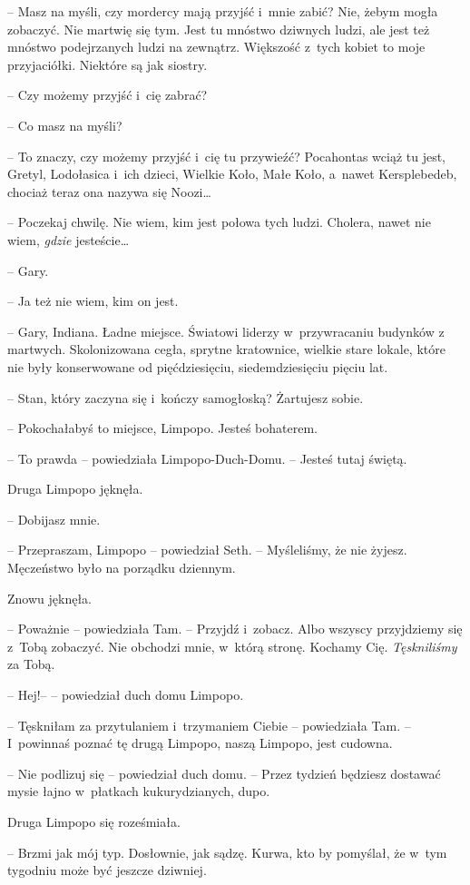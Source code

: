 \documentclass[oneside,polish,11pt,sfheadings]{mwbk}
\begin{document}
-- Masz na myśli, czy mordercy mają przyjść i~mnie zabić? Nie, żebym
mogła zobaczyć. Nie martwię się tym. Jest tu mnóstwo dziwnych ludzi, ale
jest też mnóstwo podejrzanych ludzi na zewnątrz. Większość z~tych kobiet
to moje przyjaciółki. Niektóre są jak siostry.

-- Czy możemy przyjść i~cię zabrać?

-- Co masz na myśli?

-- To znaczy, czy możemy przyjść i~cię tu przywieźć? Pocahontas wciąż tu
jest, Gretyl, Lodołasica i~ich dzieci, Wielkie Koło, Małe Koło, a~nawet
Kersplebedeb, chociaż teraz ona nazywa się Noozi\ldots 

-- Poczekaj chwilę. Nie wiem, kim jest połowa tych ludzi. Cholera, nawet
nie wiem, \textit{gdzie }jesteście\ldots 

-- Gary.

-- Ja też nie wiem, kim on jest.

-- Gary, Indiana. Ładne miejsce. Światowi liderzy w~przywracaniu budynków
z martwych. Skolonizowana cegła, sprytne kratownice, wielkie stare
lokale, które nie były konserwowane od pięćdziesięciu, siedemdziesięciu
pięciu lat.

-- Stan, który zaczyna się i~kończy samogłoską? Żartujesz sobie.

-- Pokochałabyś to miejsce, Limpopo. Jesteś bohaterem.

-- To prawda -- powiedziała Limpopo-Duch-Domu. -- Jesteś tutaj świętą.

Druga Limpopo jęknęła. 

-- Dobijasz mnie.

-- Przepraszam, Limpopo -- powiedział Seth. -- Myśleliśmy, że nie żyjesz.
Męczeństwo było na porządku dziennym.

Znowu jęknęła.

-- Poważnie -- powiedziała Tam. -- Przyjdź i~zobacz. Albo wszyscy
przyjdziemy się z~Tobą zobaczyć. Nie obchodzi mnie, w~którą stronę.
Kochamy Cię. \textit{Tęskniliśmy} za Tobą.

-- Hej!-- -- powiedział duch domu Limpopo.

-- Tęskniłam za przytulaniem i~trzymaniem Ciebie -- powiedziała Tam. -- I~powinnaś poznać tę drugą Limpopo, naszą Limpopo, jest cudowna.

-- Nie podlizuj się -- powiedział duch domu. -- Przez tydzień będziesz
dostawać mysie łajno w~płatkach kukurydzianych, dupo.

Druga Limpopo się roześmiała. 

-- Brzmi jak mój typ. Dosłownie, jak sądzę.
Kurwa, kto by pomyślał, że w~tym tygodniu może być jeszcze dziwniej.
\end{document}
